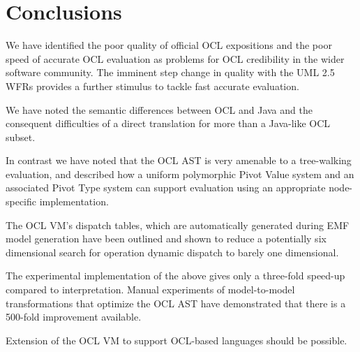 \documentclass{sig-alternate}
\begin{document}
\section{Conclusions}
We have identified the poor quality of official OCL expositions and the poor speed of accurate OCL
evaluation as problems for OCL credibility in the wider software community. The imminent step
change in quality with the UML 2.5 WFRs provides a further stimulus to tackle fast accurate evaluation.

We have noted the semantic differences between OCL and Java and the consequent difficulties of a direct
translation for more than a Java-like OCL subset.

In contrast we have noted that the OCL AST is very amenable to a tree-walking evaluation, and described how
a uniform polymorphic Pivot Value system and an associated Pivot Type system can support evaluation using
an appropriate node-specific implementation.

The OCL VM's dispatch tables, which are automatically generated during EMF model generation
have been outlined and shown to reduce a potentially six dimensional search for operation
dynamic dispatch to barely one dimensional.

The experimental implementation of the above gives only a three-fold speed-up compared to interpretation. Manual
experiments of model-to-model transformations that optimize the OCL AST have demonstrated that there is a 
500-fold improvement available.

Extension of the OCL VM to support OCL-based languages should be possible.

%


%
%
\balancecolumns
\end{document}
